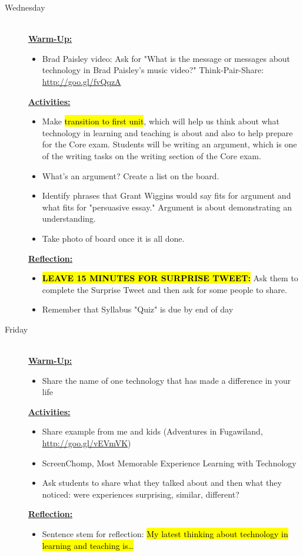 \documentclass{tufte-handout}
\newcommand{\listwed}{\item[Wednesday] \hfill \\}
\newcommand{\listfri}{\item[Friday] \hfill \\}
\newenvironment{daywu}
	{\textbf{\underline{Warm-Up:}} \hfill \\
	\begin{itemize}}
	{\end{itemize}}
\newenvironment{dayact}
	{\textbf{\underline{Activities:}} \hfill \\
	\begin{itemize}}
	{\end{itemize}}
\newenvironment{dayref}
	{\textbf{\underline{Reflection:}} \hfill \\
	\begin{itemize}}
	{\end{itemize}}
\newenvironment{weeksched}
	{\noindent
	\begin{description}}
	{\end{description}
	\newpage}
\begin{document}
\begin{fullwidth}
\begin{weeksched}
\listwed
\begin{daywu}
	\item Brad Paisley video: Ask for "What is the message or messages about technology in Brad Paisley's music video?" Think-Pair-Share: \url{http://goo.gl/fvQqzA}
\end{daywu}
\begin{dayact}
	\item Make \hl{transition to first unit}, which will help us think about what technology in learning and teaching is about and also to help prepare for the Core exam. Students will be writing an argument, which is one of the writing tasks on the writing section of the Core exam.
		\item What's an argument? Create a list on the board.
		\item Identify phrases that Grant Wiggins would say fits for argument and what fits for "persuasive essay." Argument is about demonstrating an understanding.
		\item Take photo of board once it is all done.
\end{dayact}
\begin{dayref}
		\item \textbf{\hl{LEAVE 15 MINUTES FOR SURPRISE TWEET:}} Ask them to complete the Surprise Tweet and then ask for some people to share.
		\item Remember that Syllabus "Quiz" is due by end of day
\end{dayref}

\listfri
\begin{daywu}
	\item Share the name of one technology that has made a difference in your life
\end{daywu}
\begin{dayact}
	\item Share example from me and kids (Adventures in Fugawiland, \url{http://goo.gl/vEVmVK})
	\item ScreenChomp, Most Memorable Experience Learning with Technology
	\item Ask students to share what they talked about and then what they noticed: were experiences surprising, similar, different?
\end{dayact}
\begin{dayref}
	\item Sentence stem for reflection: \hl{My latest thinking about technology in learning and teaching is\ldots}
\end{dayref}
\end{weeksched}


\end{fullwidth}
\end{document}
